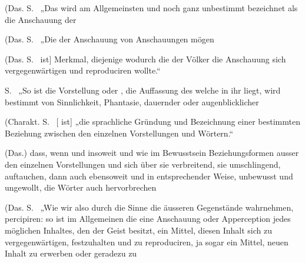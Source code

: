 (Das. S.~ „Das  wird am Allgemeinsten und noch ganz unbestimmt bezeichnet als die Anschauung der 


\clearpage 
(Das. S.~ „Die  der Anschauung von Anschauungen mögen  

(Das. S.~ \arbup{1889}{lsDarkBlue}{„[\so{Innere}}{[\so{Innere}}  ist]  Merkmal, diejenige  wodurch die  der Völker die Anschauung sich vergegenwärtigen und reproduciren wollte.“

\label{fp.322}

 S.~ „So ist die Vorstellung oder ,  die Auffassung des  welche in ihr liegt, wird bestimmt von Sinnlichkeit, Phantasie, dauernder oder augenblicklicher 

(Charakt. S.~ [ ist] „die sprachliche Gründung und Bezeichnung einer bestimmten Beziehung zwischen den einzelnen Vorstellungen und Wörtern.“

(Das.)  dass, wenn und insoweit und wie im Bewusstsein Beziehungsformen ausser den einzelnen Vorstellungen und sich über sie verbreitend, sie umschlingend, auftauchen, dann auch ebensoweit und in entsprechender Weise, unbewusst und ungewollt, die Wörter auch  hervorbrechen 

(Das. S.~ „Wie wir also durch die Sinne die äusseren Gegenstände wahrnehmen, percipiren: so ist im Allgemeinen die  eine Anschauung oder Apperception jedes möglichen Inhaltes, den der Geist besitzt, ein Mittel, diesen Inhalt sich zu vergegenwärtigen, festzuhalten und zu reproduciren, ja sogar ein Mittel, neuen Inhalt zu erwerben oder geradezu zu 

